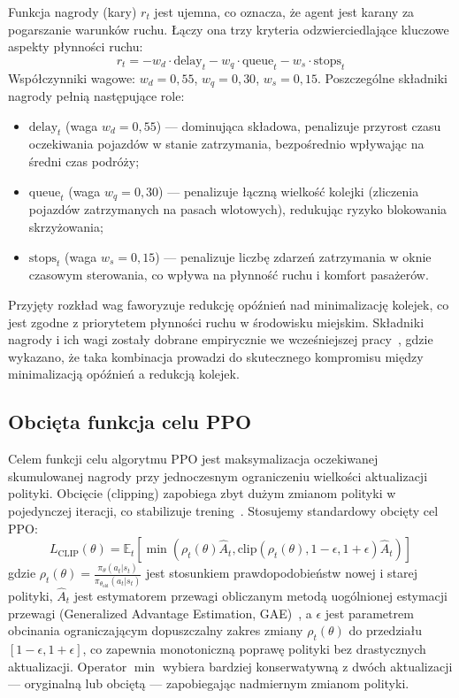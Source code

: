 \documentclass[10pt,a4paper]{article}
\begin{document}
Funkcja nagrody (kary) $r_t$ jest ujemna, co oznacza, że agent jest karany za pogarszanie warunków ruchu. Łączy ona trzy kryteria odzwierciedlające kluczowe aspekty płynności ruchu:
\begin{equation}\label{eq:reward}
r_t = - w_d \cdot \text{delay}_t - w_q \cdot \text{queue}_t - w_s \cdot \text{stops}_t
\end{equation}
Współczynniki wagowe: $w_d = 0{,}55$, $w_q = 0{,}30$, $w_s = 0{,}15$. Poszczególne składniki nagrody pełnią następujące role:
\begin{itemize}[nosep]
\item $\text{delay}_t$ (waga $w_d = 0{,}55$) --- dominująca składowa, penalizuje przyrost czasu oczekiwania pojazdów w stanie zatrzymania, bezpośrednio wpływając na średni czas podróży;
\item $\text{queue}_t$ (waga $w_q = 0{,}30$) --- penalizuje łączną wielkość kolejki (zliczenia pojazdów zatrzymanych na pasach wlotowych), redukując ryzyko blokowania skrzyżowania;
\item $\text{stops}_t$ (waga $w_s = 0{,}15$) --- penalizuje liczbę zdarzeń zatrzymania w oknie czasowym sterowania, co wpływa na płynność ruchu i komfort pasażerów.
\end{itemize}
Przyjęty rozkład wag faworyzuje redukcję opóźnień nad minimalizację kolejek, co jest zgodne z priorytetem płynności ruchu w środowisku miejskim. Składniki nagrody i ich wagi zostały dobrane empirycznie we wcześniejszej pracy~\cite{ref16}, gdzie wykazano, że taka kombinacja prowadzi do skutecznego kompromisu między minimalizacją opóźnień a redukcją kolejek.

\subsection{Obcięta funkcja celu PPO}

Celem funkcji celu algorytmu PPO jest maksymalizacja oczekiwanej skumulowanej nagrody przy jednoczesnym ograniczeniu wielkości aktualizacji polityki. Obcięcie (clipping) zapobiega zbyt dużym zmianom polityki w pojedynczej iteracji, co stabilizuje trening~\cite{ref5}. Stosujemy standardowy obcięty cel PPO:
\begin{equation}\label{eq:ppo}
L_{\text{CLIP}}(\theta) = \mathbb{E}_t \left[\min(\rho_t(\theta) \hat{A}_t, \text{clip}(\rho_t(\theta), 1-\epsilon, 1+\epsilon) \hat{A}_t)\right]
\end{equation}
gdzie $\rho_t(\theta) = \frac{\pi_\theta(a_t|s_t)}{\pi_{\theta_{\text{old}}}(a_t|s_t)}$ jest stosunkiem prawdopodobieństw nowej i starej polityki, $\hat{A}_t$ jest estymatorem przewagi obliczanym metodą uogólnionej estymacji przewagi (Generalized Advantage Estimation, GAE)~\cite{ref5}, a $\epsilon$ jest parametrem obcinania ograniczającym dopuszczalny zakres zmiany $\rho_t(\theta)$ do przedziału $[1-\epsilon, 1+\epsilon]$, co zapewnia monotoniczną poprawę polityki bez drastycznych aktualizacji. Operator $\min$ wybiera bardziej konserwatywną z dwóch aktualizacji --- oryginalną lub obciętą --- zapobiegając nadmiernym zmianom polityki.
\end{document}
